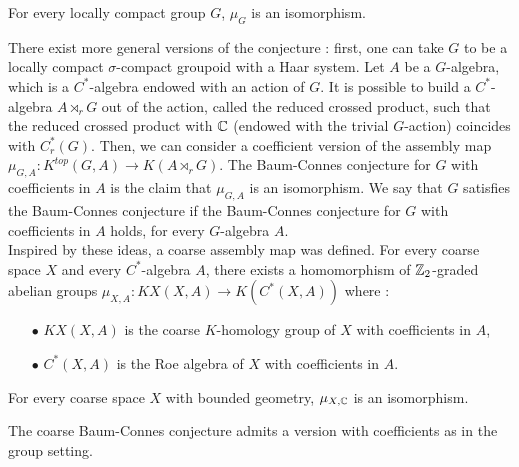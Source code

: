\begin{conj}
For every locally compact group $G$, $\mu_G$ is an isomorphism.
\end{conj}

There exist more general versions of the conjecture : first, one can take $G$ to be a locally compact $\sigma$-compact groupoid with a Haar system. Let $A$ be a $G$-algebra, which is a $C^*$-algebra endowed with an action of $G$. It is possible to build a $C^*$-algebra $A\rtimes_r G$ out of the action, called the reduced crossed product, such that the reduced crossed product with $\mathbb C$ (endowed with the trivial $G$-action) coincides with $C^*_r(G)$. Then, we can consider a coefficient version of the assembly map $\mu_{G,A} : K^{top}(G,A)\rightarrow K(A\rtimes_r G)$. The Baum-Connes conjecture for $G$ with coefficients in $A$ is the claim that $\mu_{G,A}$ is an isomorphism. We say that $G$ satisfies the Baum-Connes conjecture if the Baum-Connes conjecture for $G$ with coefficients in $A$ holds, for every $G$-algebra $A$.\\

Inspired by these ideas, a coarse assembly map was defined. For every coarse space $X$ and every $C^*$-algebra $A$, there exists a homomorphism of $\mathbb Z_2$-graded abelian groups $\mu_{X,A} : KX(X,A)\rightarrow K(C^*(X,A))$ where :\\
\begin{itemize}
\item[$\bullet$] $KX(X,A)$ is the coarse $K$-homology group of $X$ with coefficients in $A$,
\item[$\bullet$] $C^*(X,A)$ is the Roe algebra of $X$ with coefficients in $A$.\\
\end{itemize}

\begin{conj}
For every coarse space $X$ with bounded geometry, $\mu_{X,\mathbb C}$ is an isomorphism.
\end{conj}

The coarse Baum-Connes conjecture admits a version with coefficients as in the group setting.\\ 

